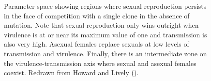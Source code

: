\documentclass[
  letterpaper,
]{book}
\begin{document}
\begin{figure}


\caption[Parameter space showing regions where sexual reproduction
persists in the face of competition with a single clone in the absence
of mutation]{\label{fig-6-4}Parameter space showing regions where sexual
reproduction persists in the face of competition with a single clone in
the absence of mutation. Note that sexual reproduction only wins
outright when virulence is at or near its maximum value of one and
transmission is also very high. Asexual females replace sexuals at low
levels of transmission and virulence. Finally, there is an intermediate
zone on the virulence-transmission axis where sexual and asexual females
coexist. Redrawn from Howard and Lively
().}

\end{figure}%
\end{document}
